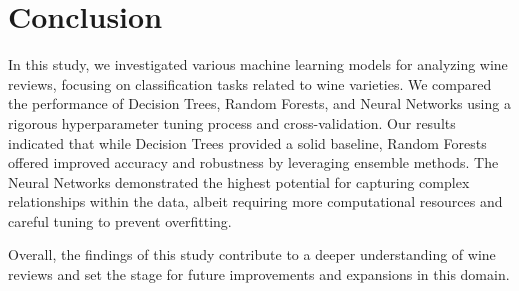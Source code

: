 \section{Conclusion}

In this study, we investigated various machine learning 
models for analyzing wine reviews, focusing on classification 
tasks related to wine varieties. We compared 
the performance of Decision Trees, Random Forests, 
and Neural Networks using a rigorous hyperparameter 
tuning process and cross-validation. Our results indicated 
that while Decision Trees provided a solid baseline, 
Random Forests offered improved accuracy and robustness 
by leveraging ensemble methods. 
The Neural Networks demonstrated the highest potential 
for capturing complex relationships within the data, 
albeit requiring more computational resources 
and careful tuning to prevent overfitting.

Overall, the findings of this study contribute to a 
deeper understanding of wine reviews and set the stage 
for future improvements and expansions in this domain.
